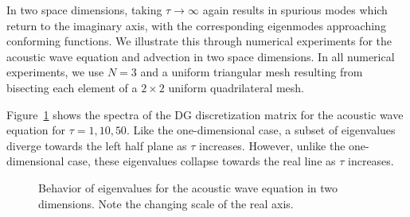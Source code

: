 \documentclass[10pt]{article}
\begin{document}
In two space dimensions, taking $\tau\rightarrow \infty$ again results in spurious modes which return to the imaginary axis, with the corresponding eigenmodes approaching conforming functions.  
We illustrate this through numerical experiments for the acoustic wave equation and advection in two space dimensions.  In all numerical experiments, we use $N=3$ and a uniform triangular mesh resulting from bisecting each element of a $2\times 2$ uniform quadrilateral mesh.  

Figure~\ref{fig:waveeigs} shows the spectra of the DG discretization matrix for the acoustic wave equation for $\tau = 1, 10, 50$.  Like the one-dimensional case, a subset of eigenvalues diverge towards the left half plane as $\tau$ increases.  However, unlike the one-dimensional case, these eigenvalues collapse towards the real line as $\tau$ increases.  


\begin{figure}
\centering
{}
\hspace{.5em}
\hspace{.5em}
\caption{Behavior of eigenvalues for the acoustic wave equation in two dimensions. Note the changing scale of the real axis.}
\label{fig:waveeigs}
\end{figure}
\end{document}
